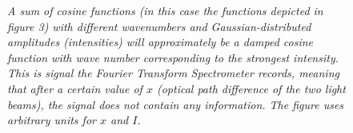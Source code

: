 \documentclass[a4paper]{article}
\begin{document}
\begin{figure}[htb!]

\label{sumCos}

\begin{center}


\end{center}

\caption{\textit{A sum of cosine functions (in this case the functions depicted in figure 3) with different wavenumbers and Gaussian-distributed amplitudes (intensities) will approximately be a damped cosine function with wave number corresponding to the strongest intensity. This is signal the Fourier Transform Spectrometer records, meaning that after a certain value of $x$ (optical path difference of the two light beams), the signal does not contain any information. The figure uses arbitrary units for $x$ and $I$.}}

\end{figure}








\end{document}
